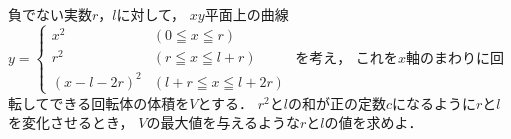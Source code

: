 \documentclass[../../main.tex]{subfiles}
\begin{document}
負でない実数$r$，$l$に対して，
$xy$平面上の曲線$y=
\begin{cases}
  x^2 & (0 \leqq x \leqq r) \\
  r^2 & (r \leqq x \leqq l+r) \\
  (x-l-2r)^2 & (l+r \leqq x \leqq l+2r)
\end{cases}$
を考え，
これを$x$軸のまわりに回転してできる回転体の体積を$V$とする．
$r^2$と$l$の和が正の定数$c$になるように$r$と$l$を変化させるとき，
$V$の最大値を与えるような$r$と$l$の値を求めよ．
\end{document}
